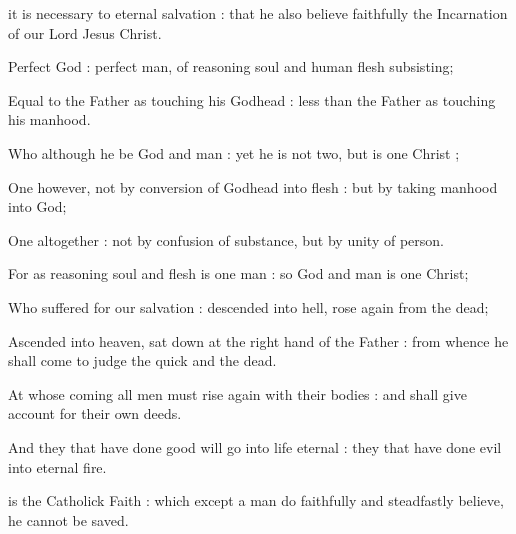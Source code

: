 {     it is necessary to eternal salvation : that he also believe faithfully the Incarnation of our Lord Jesus Christ.\par
    Perfect God : perfect man, of reasoning soul and human flesh subsisting;\par
    Equal to the Father as touching his Godhead : less than the Father as touching his manhood.\par
    Who although he be God and man : yet he is not two, but is one Christ ;\par
    One however, not by conversion of Godhead into flesh : but by taking manhood into God;\par
    One altogether : not by confusion of substance, but by unity of person.\par
    For as reasoning soul and flesh is one man : so God and man is one Christ;\par
    Who suffered for our salvation : descended into hell, rose again from the dead;\par
    Ascended into heaven, sat down at the right hand of the Father : from whence he shall come to judge the quick and the dead.\par
    At whose coming all men must rise again with their bodies : and shall give account for their own deeds.\par
    And they that have done good will go into life eternal : they that have done evil into eternal fire.

     is the Catholick Faith : which except a man do faithfully and steadfastly believe, he cannot be saved.%
}
